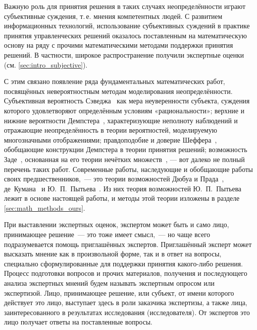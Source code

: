Важную роль для принятия решения в таких случаях неопределённости играют субъективные суждения, т.\,е. мнения компетентных людей. С развитием информационных технологий, использование субъективных суждений в практике принятия управленческих решений оказалось поставленным на математическую основу на ряду с прочими математическими методами поддержки принятия решений. В частности, широкое распространение получили экспертные оценки (см. \ref{sec:intro_subjective}).

 С этим связано появление ряда фундаментальных математических работ, посвящённых невероятностным методам моделирования неопределённости. Субъективная вероятность Сэведжа~\cite{savage1972foundations} как мера неуверенности субъекта, суждения которого удовлетворяют определённым условиям «рациональности»; верхние и нижние вероятности Демпстера~\cite{dempster}, характеризующие неполноту наблюдений и отражающие неопределённость в теории вероятностей, моделируемую многозначными отображениями; правдоподобие и доверие Шеффера~\cite{shafer}, обобщающие конструкции Демпстера в теории принятия решений; возможность Заде~\cite{citeZadeh}, основанная на его теории нечётких множеств~\cite{ZadehPrime}, — вот далеко не полный перечень таких работ. Современные работы, наследующие и обобщающие работы своих предшественников,~--- это теории возможностей Дюбуа и Прада~\cite{dubois_prade-1990, Dubois2015}, де~Кумана~\cite{de1992possibility} и Ю.~П.~Пытьева~\cite{possbook, probbook}. Из них теория возможностей Ю.~П.~Пытьева лежит в основе настоящей работы, и методы этой теории изложены в разделе \ref{sec:math_methods_ours}.  

При выставлении экспертных оценок, экспертом может быть и само лицо, принимающее решение~--- это тоже имеет смысл,~--- но чаще всего подразумевается помощь приглашённых экспертов.  Приглашённый эксперт может высказать мнение как в произвольной форме, так и в ответ на вопросы, специально сформулированные для поддержки принятия какого-либо решения. Процесс подготовки вопросов и прочих материалов, получения и последующего анализа экспертных мнений будем называть экспертным опросом или  экспертизой. Лицо, принимающее решение, или субъект, от имени которого действует это лицо, выступает здесь в роли заказчика экспертизы, а также лица, заинтересованного в результатах исследования (исследователя). От экспертов это лицо получает ответы на поставленные вопросы.

